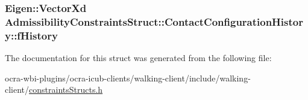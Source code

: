 \hypertarget{structAdmissibilityConstraintsStruct_1_1ContactConfigurationHistory_a24d268be0877f74053e771053327d08d}{
\subsubsection[{f\-History}]{\setlength{\rightskip}{0pt plus 5cm}\-Eigen\-::\-Vector\-Xd {\bf \-Admissibility\-Constraints\-Struct\-::\-Contact\-Configuration\-History\-::f\-History}}}\label{structAdmissibilityConstraintsStruct_1_1ContactConfigurationHistory_a24d268be0877f74053e771053327d08d}


\-The documentation for this struct was generated from the following file\-:\begin{DoxyCompactItemize}
\item 
ocra-\/wbi-\/plugins/ocra-\/icub-\/clients/walking-\/client/include/walking-\/client/\hyperlink{constraintsStructs_8h}{constraints\-Structs.\-h}\end{DoxyCompactItemize}
